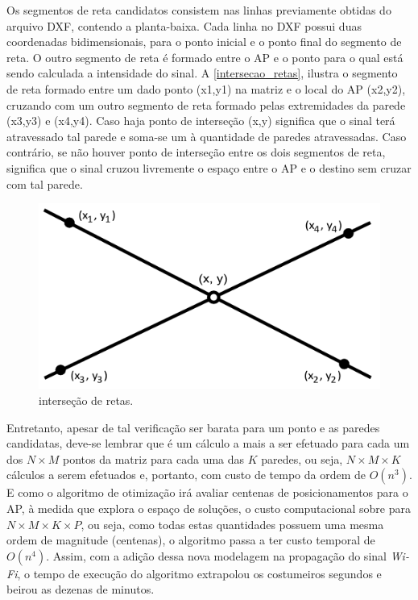\documentclass[
	12pt,				%
	openright,			%
	twoside,			%
	a4paper,			%
	english,			%
	french,				%
	spanish,			%
	brazil				%
	]{abntex2}
\begin{document}
Os segmentos de reta candidatos consistem nas linhas previamente obtidas do arquivo DXF, contendo a planta-baixa. Cada linha no DXF possui duas coordenadas bidimensionais, para o ponto inicial e o ponto final do segmento de reta. O outro segmento de reta é formado entre o AP e o ponto para o qual está sendo calculada a intensidade do sinal. A \autoref{intersecao_retas}, ilustra o segmento de reta formado entre um dado ponto (x1,y1) na matriz e o local do AP  (x2,y2), cruzando com um outro segmento de reta formado pelas extremidades da parede (x3,y3) e (x4,y4). Caso haja ponto de interseção (x,y) significa que o sinal terá atravessado tal parede e soma-se um à quantidade de paredes atravessadas. Caso contrário, se não houver ponto de interseção entre os dois segmentos de reta, significa que o sinal cruzou livremente o espaço entre o AP e o destino sem cruzar com tal parede. 
\begin{figure}[ht]
	\caption{\label{intersecao_retas}interseção de retas.}
	\begin{center}
		\includegraphics[scale=0.7]{images/inter.jpg}
	\end{center}
\end{figure}

Entretanto, apesar de tal verificação ser barata para um ponto e as paredes candidatas, deve-se lembrar que é um cálculo a mais a ser efetuado para cada um dos $N \times M$ pontos da matriz para cada uma das $ K $ paredes, ou seja, $N \times M \times K$ cálculos a serem efetuados e, portanto, com custo de tempo da ordem de $O(n^{3})$. E como o algoritmo de otimização irá avaliar centenas de posicionamentos para o AP, à medida que explora o espaço de soluções, o custo computacional sobre para $N \times M \times K \times P$, ou seja, como todas estas quantidades possuem uma mesma ordem de magnitude (centenas), o algoritmo passa a ter custo temporal de $O(n^{4})$. Assim, com a adição dessa nova modelagem na propagação do sinal \textit{Wi-Fi}, o tempo de execução do algoritmo extrapolou os costumeiros segundos e beirou as dezenas de minutos. 
\end{document}
